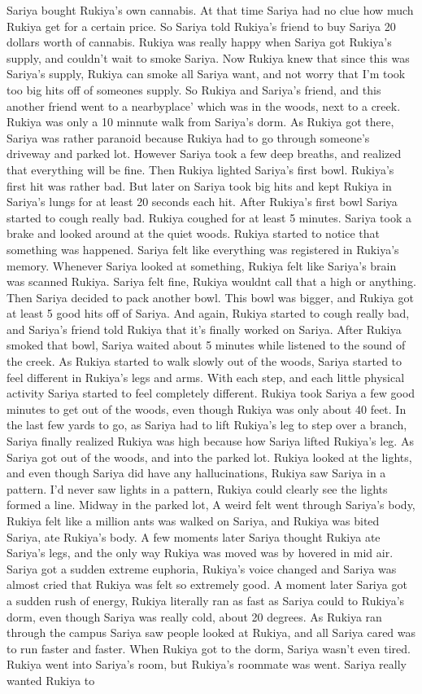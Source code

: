 \documentclass[12pt]{book}
\begin{document}
Sariya bought Rukiya's own cannabis. At that time Sariya had no clue how much Rukiya get for a certain price. So Sariya told Rukiya's friend to buy Sariya 20 dollars worth of cannabis. Rukiya was really happy when Sariya got Rukiya's supply, and couldn't wait to smoke Sariya. Now Rukiya knew that since this was Sariya's supply, Rukiya can smoke all Sariya want, and not worry that I'm took too big hits off of someones supply. So Rukiya and Sariya's friend, and this another friend went to a nearbyplace' which was in the woods, next to a creek. Rukiya was only a 10 minnute walk from Sariya's dorm. As Rukiya got there, Sariya was rather paranoid because Rukiya had to go through someone's driveway and parked lot. However Sariya took a few deep breaths, and realized that everything will be fine. Then Rukiya lighted Sariya's first bowl. Rukiya's first hit was rather bad. But later on Sariya took big hits and kept Rukiya in Sariya's lungs for at least 20 seconds each hit. After Rukiya's first bowl Sariya started to cough really bad. Rukiya coughed for at least 5 minutes. Sariya took a brake and looked around at the quiet woods. Rukiya started to notice that something was happened. Sariya felt like everything was registered in Rukiya's memory. Whenever Sariya looked at something, Rukiya felt like Sariya's brain was scanned Rukiya. Sariya felt fine, Rukiya wouldnt call that a high or anything. Then Sariya decided to pack another bowl. This bowl was bigger, and Rukiya got at least 5 good hits off of Sariya. And again, Rukiya started to cough really bad, and Sariya's friend told Rukiya that it's finally worked on Sariya. After Rukiya smoked that bowl, Sariya waited about 5 minutes while listened to the sound of the creek. As Rukiya started to walk slowly out of the woods, Sariya started to feel different in Rukiya's legs and arms. With each step, and each little physical activity Sariya started to feel completely different. Rukiya took Sariya a few good minutes to get out of the woods, even though Rukiya was only about 40 feet. In the last few yards to go, as Sariya had to lift Rukiya's leg to step over a branch, Sariya finally realized Rukiya was high because how Sariya lifted Rukiya's leg. As Sariya got out of the woods, and into the parked lot. Rukiya looked at the lights, and even though Sariya did have any hallucinations, Rukiya saw Sariya in a pattern. I'd never saw lights in a pattern, Rukiya could clearly see the lights formed a line. Midway in the parked lot, A weird felt went through Sariya's body, Rukiya felt like a million ants was walked on Sariya, and Rukiya was bited Sariya, ate Rukiya's body. A few moments later Sariya thought Rukiya ate Sariya's legs, and the only way Rukiya was moved was by hovered in mid air. Sariya got a sudden extreme euphoria, Rukiya's voice changed and Sariya was almost cried that Rukiya was felt so extremely good. A moment later Sariya got a sudden rush of energy, Rukiya literally ran as fast as Sariya could to Rukiya's dorm, even though Sariya was really cold, about 20 degrees. As Rukiya ran through the campus Sariya saw people looked at Rukiya, and all Sariya cared was to run faster and faster. When Rukiya got to the dorm, Sariya wasn't even tired. Rukiya went into Sariya's room, but Rukiya's roommate was went. Sariya really wanted Rukiya to 
\end{document}

